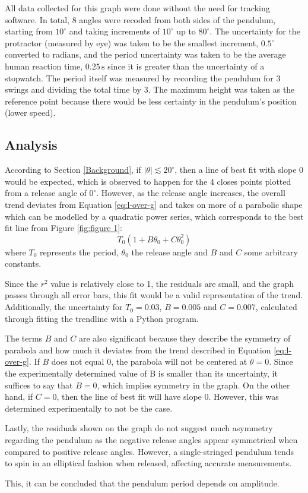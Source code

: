 \documentclass[12pt]{article}
\begin{document}
All data collected for this graph were done without the need for tracking software. {\color{blue}In total, 8 angles were recoded from both sides of the pendulum, starting from $10^\circ$ and taking increments of $10^\circ$ up to $80^\circ$}. The uncertainty for the protractor (measured by eye) was taken to be the smallest increment, $0.5^{\circ}$ converted to radians, and the period uncertainty was taken to be the average human reaction time, $0.25\,\text{s}$ \cite{reaction-time} {\color{blue} since it is greater than the uncertainty of a stopwatch. The period itself was measured by recording the pendulum for 3 swings and dividing the total time by 3. The maximum height was taken as the reference point because there would be less certainty in the pendulum's position (lower speed).}

\subsection{Analysis}
According to Section \ref{Background}, {\color{blue} if $|\theta| \lesssim 20^{\circ}$, then a line of best fit with slope 0 would be expected, which is observed to happen for the 4 closes points plotted from a release angle of $0^\circ$. However, as the release angle increases, the overall trend deviates from Equation \ref{eq:l-over-g} and takes on more of a parabolic shape which can be modelled by a quadratic power series, which corresponds to the best fit line from Figure \ref{fig:figure 1}:}
\begin{equation} \label{eq:power series}
    T_0(1 + B\theta_0 + C\theta_0^2)
\end{equation}
where $T_0$ represents the period, $\theta_0$ the release angle and $B$ and $C$ some arbitrary constants. {\color{blue}Since the $r^2$ value is relatively close to 1, the residuals are small, and the graph passes through all error bars, this fit would be a valid representation of the trend. Additionally, the uncertainty for $T_0 = 0.03$, $B = 0.005$ and $C = 0.007$, calculated through fitting the trendline with a Python program.

The terms $B$ and $C$ are also significant because they describe the symmetry of parabola and how much it deviates from the trend described in Equation \ref{eq:l-over-g}. If $B$ does not equal 0, the parabola will not be centered at $\theta = 0$. Since the experimentally determined value of B is smaller than its uncertainty, it suffices to say that $B = 0$, which implies symmetry in the graph. On the other hand, if $C = 0$, then the line of best fit will have slope 0. However, this was determined experimentally to not be the case.


Lastly, the residuals shown on the graph do not suggest much asymmetry regarding the pendulum as the negative release angles appear symmetrical when compared to positive release angles. However, a single-stringed pendulum tends to spin in an elliptical fashion when released, affecting accurate measurements.

This, it can be concluded that the pendulum period depends on amplitude.}
\end{document}
